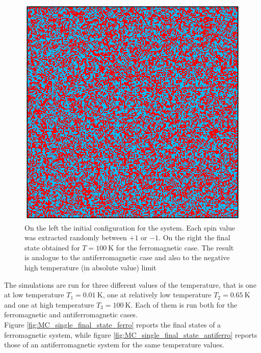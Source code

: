\begin{figure}
\begin{minipage}[c]{0.45\textwidth}
        \includegraphics[scale=0.38]{./images/ising/T_100_ferro.eps}
    \end{minipage}
    \caption{On the left the initial configuration for the system. Each spin value was extracted randomly between $+1$ or $-1$. On the right the final state obtained for $T = \SI{100}{\kelvin}$
    for the ferromagnetic case. The result is analogue to the antiferromagnetic case and also to the negative high temperature (in absolute value) limit}
    \label{fig:initial_configuration}
\end{figure}
The simulations are run for three different values of the temperature, that is one at low temperature $T_1 = \SI{0.01}{\kelvin}$, one at relatively low temperature $T_2 = \SI{0.65}{\kelvin}$ and one at high temperature $T_3 = \SI{100}{\kelvin}$. Each of them is run both 
for the ferromagnetic and antiferromagnetic cases. \\
Figure \ref{fig:MC_single_final_state_ferro} reports the final states of a ferromagnetic system, while
figure \ref{fig:MC_single_final_state_antiferro} reports those of an antiferromagnetic system for the same temperature values. \\
